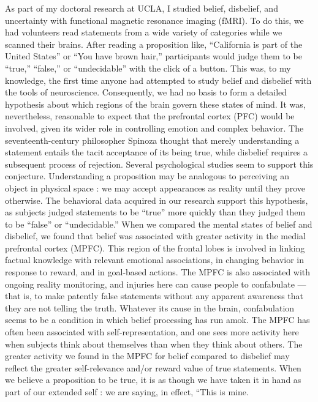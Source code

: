 \documentclass[a4paper,14pt]{extbook}
\begin{document}
As part of my doctoral research at UCLA, I studied belief, disbelief, and uncertainty with functional magnetic resonance imaging (fMRI).
To do this, we had volunteers read statements from a wide variety of categories while we scanned their brains.
After reading a proposition like, ``California is part of the United States'' or ``You have brown hair,'' participants would judge them to be ``true,'' ``false,'' or ``undecidable'' with the click of a button.
This was, to my knowledge, the first time anyone had attempted to study belief and disbelief with the tools of neuroscience.
Consequently, we had no basis to form a detailed hypothesis about which regions of the brain govern these states of mind.
It was, nevertheless, reasonable to expect that the prefrontal cortex (PFC) would be involved, given its wider role in controlling emotion and complex behavior.
The seventeenth-century philosopher Spinoza thought that merely understanding a statement entails the tacit acceptance of its being true, while disbelief requires a subsequent process of rejection.
Several psychological studies seem to support this conjecture.
Understanding a proposition may be analogous to perceiving an object in physical space :
we may accept appearances as reality until they prove otherwise.
The behavioral data acquired in our research support this hypothesis, as subjects judged statements to be ``true'' more quickly than they judged them to be ``false'' or ``undecidable.''
When we compared the mental states of belief and disbelief, we found that belief was associated with greater activity in the medial prefrontal cortex (MPFC).
This region of the frontal lobes is involved in linking factual knowledge with relevant emotional associations, in changing behavior in response to reward, and in goal-based actions.
The MPFC is also associated with ongoing reality monitoring, and injuries here can cause people to confabulate --- that is, to make patently false statements without any apparent awareness that they are not telling the truth.
Whatever its cause in the brain, confabulation seems to be a condition in which belief processing has run amok.
The MPFC has often been associated with self-representation, and one sees more activity here when subjects think about themselves than when they think about others.
The greater activity we found in the MPFC for belief compared to disbelief may reflect the greater self-relevance and/or reward value of true statements.
When we believe a proposition to be true, it is as though we have taken it in hand as part of our extended self :
we are saying, in effect, ``This is mine.
\end{document}
